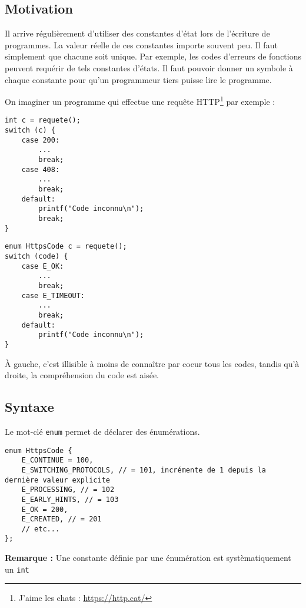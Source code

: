 \documentclass[../../../main.tex]{subfiles}
\begin{document}
\subsection{Motivation}
Il arrive régulièrement d'utiliser des constantes d'état lors de l'écriture de programmes. La valeur réelle de ces constantes importe souvent peu. Il faut simplement que chacune soit unique. Par exemple, les codes d'erreurs de fonctions peuvent requérir de tels constantes d'états. 
Il faut pouvoir donner un symbole à chaque constante pour qu'un programmeur tiers puisse lire le programme.

On imaginer un programme qui effectue une requête HTTP\footnote{J'aime les chats : \url{https://http.cat/}} par exemple :

\begin{minipage}{0.5\textwidth}
\begin{verbatim}
int c = requete();
switch (c) {
	case 200:
		...
		break;
	case 408:
		...
		break;
	default:
		printf("Code inconnu\n");
		break;
}
\end{verbatim}
\end{minipage}
\begin{minipage}{0.5\textwidth}
\begin{verbatim}
enum HttpsCode c = requete();
switch (code) {
	case E_OK:
		...
		break;
	case E_TIMEOUT:
		...
		break;
	default:
		printf("Code inconnu\n");
}
\end{verbatim}
\end{minipage}

À gauche, c'est illisible à moins de connaître par coeur tous les codes, tandis qu'à droite, la compréhension du code est aisée.
\subsection{Syntaxe}
Le mot-clé \texttt{enum} permet de déclarer des énumérations.

\begin{verbatim}
enum HttpsCode {
	E_CONTINUE = 100,
	E_SWITCHING_PROTOCOLS, // = 101, incrémente de 1 depuis la dernière valeur explicite
	E_PROCESSING, // = 102
	E_EARLY_HINTS, // = 103
	E_OK = 200,
	E_CREATED, // = 201
	// etc...
};
\end{verbatim}
\textbf{Remarque :} Une constante définie par une énumération est systèmatiquement un \texttt{int}
\end{document}
